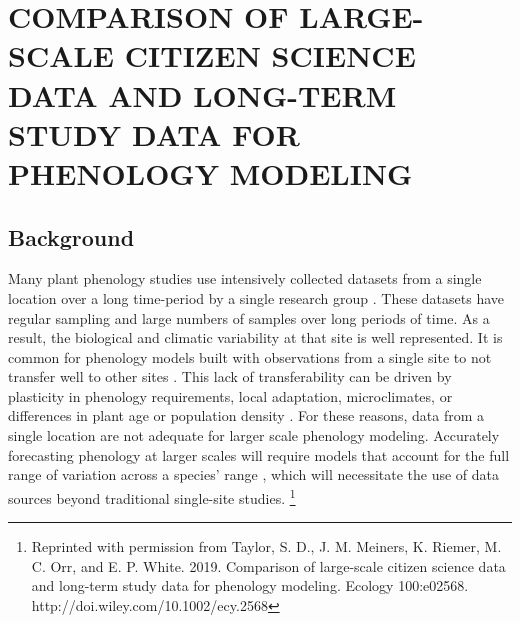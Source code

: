 \chapter{COMPARISON OF LARGE-SCALE CITIZEN SCIENCE DATA AND LONG-TERM STUDY DATA FOR PHENOLOGY MODELING}

\section{Background}

Many plant phenology studies use intensively collected datasets from a single location over a long time-period by a single research group \citep{cook2012, wolkovich2012, iler2013, roberts2015}. These datasets have regular sampling and large numbers of samples over long periods of time. As a result, the biological and climatic variability at that site is well represented. It is common for phenology models built with observations from a single site to not transfer well to other sites \citep{garcia-mozo2008, xu2013, olsson2014, basler2016}. This lack of transferability can be driven by plasticity in phenology requirements, local adaptation, microclimates, or differences in plant age or population density \citep{kramer1995, diez2012}. For these reasons, data from a single location are not adequate for larger scale phenology modeling. Accurately forecasting phenology at larger scales will require models that account for the full range of variation across a species' range \citep{richardson2013, tang2016, chuine2017}, which will necessitate the use of data sources beyond traditional single-site studies. \renewcommand*{\thefootnote}{}\footnote{Reprinted with permission from Taylor, S. D., J. M. Meiners, K. Riemer, M. C. Orr, and E. P. White. 2019. Comparison of large-scale citizen science data and long-term study data for phenology modeling. Ecology 100:e02568. http://doi.wiley.com/10.1002/ecy.2568}

